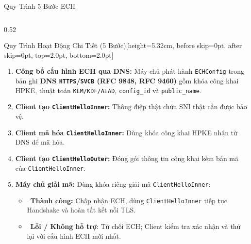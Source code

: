 \documentclass[aspectratio=169, 10pt]{beamer}
\begin{document}
\begin{frame}{Quy Trình 5 Bước ECH}
\begin{columns}[T]
		\begin{column}{0.52\textwidth}
			\begin{accentcard}[uetblue]{Quy Trình Hoạt Động Chi Tiết (5 Bước)}[height=5.32cm, before skip=0pt, after skip=0pt, top=2.0pt, bottom=2.0pt]
				\raggedright
				\setlength{\leftmargini}{11pt}
				\begin{enumerate}\setlength{\itemsep}{1.6pt}\setlength{\topsep}{0pt}\fontsize{6.0pt}{7.5pt}\selectfont
					\item \textbf{Công bố cấu hình ECH qua DNS:} Máy chủ phát hành \texttt{ECHConfig} trong bản ghi \textbf{DNS \texttt{HTTPS}/\texttt{SVCB} (RFC 9848, RFC 9460)} gồm khóa công khai HPKE, thuật toán \texttt{KEM/KDF/AEAD}, \texttt{config\_id} và \texttt{public\_name}.
					\item \textbf{Client tạo \texttt{ClientHelloInner}:} Thông điệp thật chứa SNI thật cần được bảo vệ.
					\item \textbf{Client mã hóa \texttt{ClientHelloInner}:} Dùng khóa công khai HPKE nhận từ DNS để mã hóa.
					\item \textbf{Client tạo \texttt{ClientHelloOuter}:} Đóng gói thông tin công khai kèm bản mã của \texttt{ClientHelloInner}.
					\item \textbf{Máy chủ giải mã:} Dùng khóa riêng giải mã \texttt{ClientHelloInner}:
					      \begin{itemize}\setlength{\itemsep}{0.8pt}\setlength{\topsep}{1pt}\fontsize{5.85pt}{7.1pt}\selectfont
						      \item \cmark\ \textbf{Thành công:} Chấp nhận ECH, dùng \texttt{ClientHelloInner} tiếp tục Handshake và hoàn tất kết nối TLS.
						      \item \xmark\ \textbf{Lỗi / Không hỗ trợ}: Từ chối ECH; Client kiểm tra xác nhận và thử lại với cấu hình ECH mới nhất.
					      \end{itemize}
				\end{enumerate}
			\end{accentcard}
		\end{column}
	\end{columns}
\end{frame}
\end{document}
